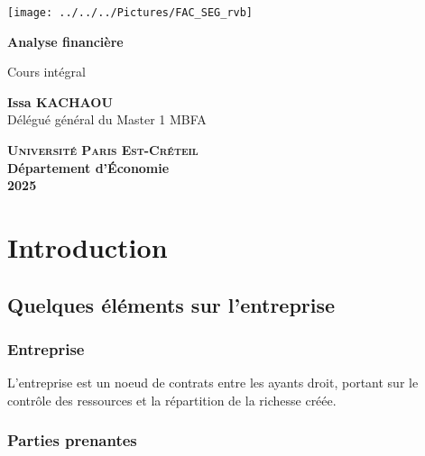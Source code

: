 \documentclass[a4paper, 12pt]{report}
\begin{document}
\begin{titlepage}
	\centering
\begin{center}
	\texttt{[image: ../../../Pictures/FAC\_SEG\_rvb]}
\end{center}
\vspace*{2cm}

\Huge

\textbf{Analyse financière}
\vspace{1.5cm}

\Large
Cours intégral

\vspace{2cm}

\textbf{Issa KACHAOU} \\
{\normalsize Délégué général du Master 1 MBFA}


\vfill

\Large

\textsc{\textbf{Université Paris Est-Créteil}}	 \\
\textbf{Département d'\'Economie} \\
\textbf{2025}

\end{titlepage}
\thispagestyle{empty}
\newpage
\clearpage
\mbox{}
\thispagestyle{empty}

\tableofcontents

\thispagestyle{empty}
\newpage
\mbox{}
\thispagestyle{empty} %

\pagestyle{plain} 
\chapter*{Introduction}
	
\section{Quelques éléments sur l'entreprise}

\subsection{Entreprise}

L'entreprise est un noeud de contrats entre les ayants droit, portant sur le contrôle des ressources et la répartition de la richesse créée. 

\subsection{Parties prenantes}
\end{document}
